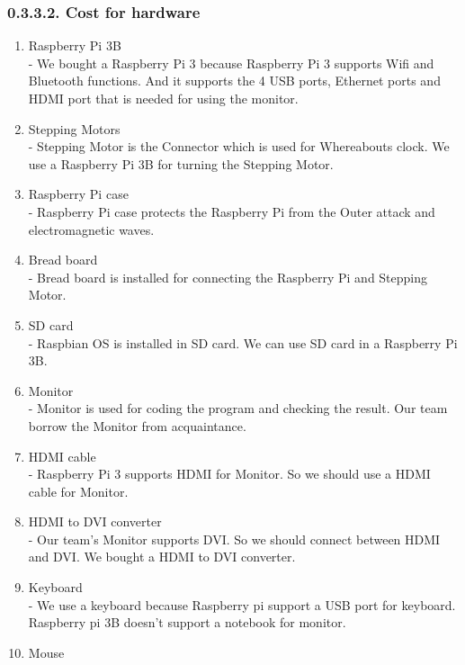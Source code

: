 \documentclass[10pt,a4paper,twocolumn]{report}
\begin{document}
		\subsubsection{0.3.3.2. Cost for hardware}
		\begin{enumerate}
			\item Raspberry Pi 3B \\
			- We bought a Raspberry Pi 3 because Raspberry Pi 3 supports Wifi and Bluetooth functions. And it supports the 4 USB ports, Ethernet ports and HDMI port that is needed for using the monitor. 
			\item Stepping Motors \\
			- Stepping Motor is the Connector which is used for Whereabouts clock. We use a Raspberry Pi 3B for turning the Stepping Motor. \\
			\item Raspberry Pi case \\
			- Raspberry Pi case protects the Raspberry Pi from the Outer attack and electromagnetic waves. \\
			\item Bread board \\
			- Bread board is installed for connecting the Raspberry Pi and Stepping Motor.\\
			\item SD card \\
			- Raspbian OS is installed in SD card. We can use SD card in a Raspberry Pi 3B.\\
			\item Monitor \\
			- Monitor is used for coding the program and checking the result. Our team borrow the Monitor from acquaintance.\\
			\item HDMI cable \\ 
			- Raspberry Pi 3 supports HDMI for Monitor. So we should use a HDMI cable for Monitor. \\
			\item HDMI to DVI converter \\
			- Our team’s Monitor supports DVI. So we should connect between HDMI and DVI. We bought a HDMI to DVI converter. \\
			\item Keyboard \\
			- We use a keyboard because Raspberry pi support a USB port for keyboard. Raspberry pi 3B doesn’t support a notebook for monitor. \\
			\item Mouse \\

\end{enumerate}
\end{document}
